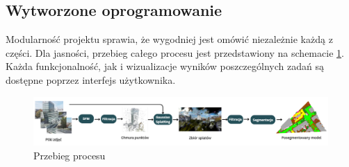 \subsection{Wytworzone oprogramowanie}

Modularność projektu sprawia, że wygodniej jest omówić niezależnie każdą z części. Dla jasności, przebieg całego procesu jest przedstawiony na schemacie \ref{fig:przebieg_procesu}. Każda funkcjonalność, jak i wizualizacje wyników poszczególnych zadań są dostępne poprzez interfejs użytkownika. 

\begin{figure}[!h]
    \centering
    \includegraphics[width=1.0\linewidth]{images/przebieg.png}
    \caption{Przebieg procesu}
    \label{fig:przebieg_procesu}
\end{figure}